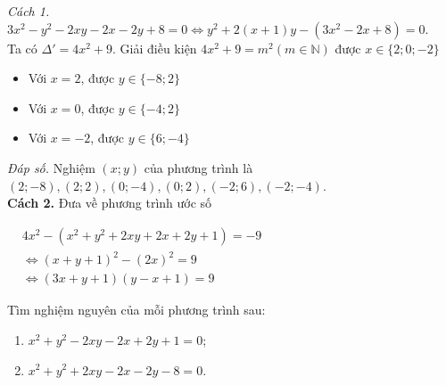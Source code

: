 \begin{bt}
{\begin{enumerate}
    \textit{Cách 1.} $3x^2-y^2-2xy-2x-2y+8=0 \Leftrightarrow y^2+2(x+1)y-(3x^2-2x+8)=0$.\\
    Ta có $\Delta'=4x^2+9$. Giải điều kiện $4x^2+9=m^2 (m \in \mathbb{N})$ được $x \in \{2;0;-2\}$
    \begin{itemize}
    \item Với $x=2$, được $y \in \{ -8;2 \}$
    \item Với $x=0$, được $y \in \{ -4;2 \}$
    \item Với $x=-2$, được $y \in \{ 6;-4 \}$ 
    \end{itemize}
     \textit{Đáp số.} Nghiệm $(x;y)$ của phương trình là $ (2;-8),(2;2),(0;-4),(0;2),(-2;6),(-2;-4)$. \\
     \textbf{Cách 2.} Đưa về phương trình ước số
     
      $
     \begin{aligned}
     &4x^2-(x^2+y^2+2xy+2x+2y+1)=-9\\
     & \Leftrightarrow (x+y+1)^2-(2x)^2=9\\
     & \Leftrightarrow (3x+y+1)(y-x+1)=9
     \end{aligned}
     $
    \end{enumerate}
    }
\end{bt}
\begin{bt}%
    Tìm nghiệm nguyên của mỗi phương trình sau:
    \begin{enumerate}
    \item $x^2+y^2-2xy-2x+2y+1=0$;
    \item $x^2+y^2+2xy-2x-2y-8=0$.
    \end{enumerate}
\end{bt}

